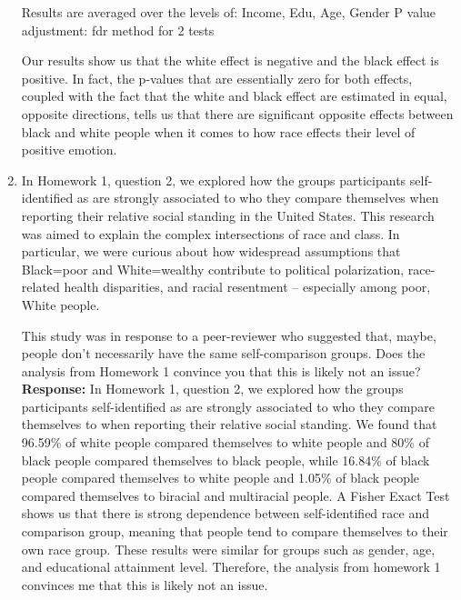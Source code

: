 \documentclass{article}
\begin{document}
\begin{enumerate}
\begin{Schunk}
\begin{Soutput}
Results are averaged over the levels of: Income, Edu, Age, Gender 
P value adjustment: fdr method for 2 tests 
\end{Soutput}
\end{Schunk}
Our results show us that the white effect is negative and the black effect is positive. In fact, the p-values that are essentially zero for both effects, coupled with the fact that the white and black effect are estimated in equal, opposite directions, tells us that there are significant opposite effects between black and white people when it comes to how race effects their level of positive emotion. 

\item In Homework 1, question 2, we explored how the groups participants self-identified as are strongly 
associated to who they compare themselves when reporting their relative social standing in the United States.
This research was aimed to explain the complex intersections of race and class. In particular, we were curious
about how widespread assumptions that Black=poor and White=wealthy contribute to political polarization, race-related health disparities, and racial resentment -- especially among poor, White people.

This study was in response to a peer-reviewer who suggested that, maybe, people don't necessarily have the same
self-comparison groups. Does the analysis from Homework 1 convince you that this is likely not an issue?
\newline \textbf{Response:}
In Homework 1, question 2, we explored how the groups participants self-identified as are strongly associated to who they compare themselves to when reporting their relative social standing. We found that 96.59\% of white people compared themselves to white people and 80\% of black people compared themselves to black people, while 16.84\% of black people compared themselves to white people and 1.05\% of black people compared themselves to biracial and multiracial people. A Fisher Exact Test shows us that there is strong dependence between self-identified race and comparison group, meaning that people tend to compare themselves to their own race group. These results were similar for groups such as gender, age, and educational attainment level. Therefore, the analysis from homework 1 convinces me that this is likely not an issue. 
\end{enumerate}

\end{document}

